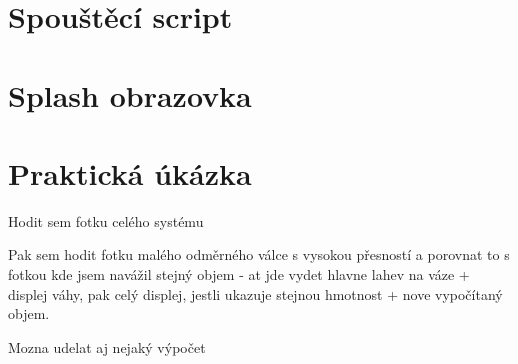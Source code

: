 \section{Spouštěcí script}
\section{Splash obrazovka}
\section{Praktická úkázka}
Hodit sem fotku celého systému

Pak sem hodit fotku malého odměrného válce s vysokou přesností a porovnat to s fotkou kde jsem navážil stejný objem - at jde vydet hlavne lahev na váze + displej váhy, pak celý displej, jestli ukazuje stejnou hmotnost + nove vypočítaný objem.

Mozna udelat aj nejaký výpočet